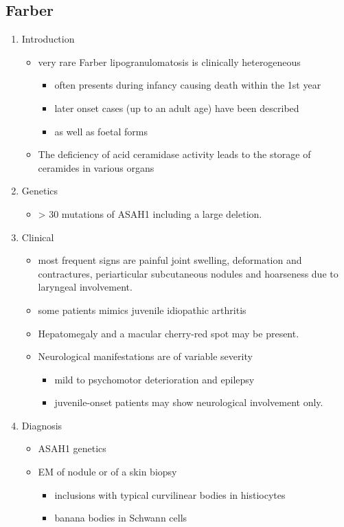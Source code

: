 \documentclass{scrartcl}
\begin{document}
\subsection{Farber}
\label{sec:orge966da2}
\begin{enumerate}
\item Introduction
\label{sec:orgb47137b}
\begin{itemize}
\item very rare Farber lipogranulomatosis is clinically heterogeneous
\begin{itemize}
\item often presents during infancy causing death within the 1st year
\item later onset cases (up to an adult age) have been described
\item as well as foetal forms
\end{itemize}
\item The deficiency of acid ceramidase activity leads to the storage of
ceramides in various organs
\end{itemize}
\item Genetics
\label{sec:org592d807}
\begin{itemize}
\item \textgreater{} 30 mutations of ASAH1 including a large deletion.
\end{itemize}
\item Clinical
\label{sec:org1bda51c}
\begin{itemize}
\item most frequent signs are painful joint swelling, deformation and contractures, periarticular subcutaneous nodules and hoarseness due to laryngeal involvement.
\item some patients mimics juvenile idiopathic arthritis
\item Hepatomegaly and a macular cherry-red spot may be present.
\item Neurological manifestations are of variable severity
\begin{itemize}
\item mild to psychomotor deterioration and epilepsy
\item juvenile-onset patients may show neurological involvement only.
\end{itemize}
\end{itemize}

\item Diagnosis
\label{sec:org0dd15ef}
\begin{itemize}
\item ASAH1 genetics
\item EM of nodule or of a skin biopsy
\begin{itemize}
\item inclusions with typical curvilinear bodies in histiocytes
\item banana bodies in Schwann cells
\end{itemize}
\end{itemize}


\end{enumerate}
\end{document}
